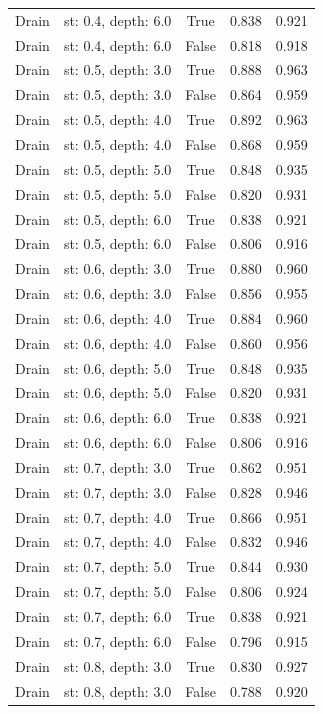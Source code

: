 \begin{small}
\begin{longtable}{llccc}
Drain & st: 0.4, depth: 6.0 & True & 0.838 & 0.921 \\
Drain & st: 0.4, depth: 6.0 & False & 0.818 & 0.918 \\
Drain & st: 0.5, depth: 3.0 & True & 0.888 & 0.963 \\
Drain & st: 0.5, depth: 3.0 & False & 0.864 & 0.959 \\
Drain & st: 0.5, depth: 4.0 & True & 0.892 & 0.963 \\
Drain & st: 0.5, depth: 4.0 & False & 0.868 & 0.959 \\
Drain & st: 0.5, depth: 5.0 & True & 0.848 & 0.935 \\
Drain & st: 0.5, depth: 5.0 & False & 0.820 & 0.931 \\
Drain & st: 0.5, depth: 6.0 & True & 0.838 & 0.921 \\
Drain & st: 0.5, depth: 6.0 & False & 0.806 & 0.916 \\
Drain & st: 0.6, depth: 3.0 & True & 0.880 & 0.960 \\
Drain & st: 0.6, depth: 3.0 & False & 0.856 & 0.955 \\
Drain & st: 0.6, depth: 4.0 & True & 0.884 & 0.960 \\
Drain & st: 0.6, depth: 4.0 & False & 0.860 & 0.956 \\
Drain & st: 0.6, depth: 5.0 & True & 0.848 & 0.935 \\
Drain & st: 0.6, depth: 5.0 & False & 0.820 & 0.931 \\
Drain & st: 0.6, depth: 6.0 & True & 0.838 & 0.921 \\
Drain & st: 0.6, depth: 6.0 & False & 0.806 & 0.916 \\
Drain & st: 0.7, depth: 3.0 & True & 0.862 & 0.951 \\
Drain & st: 0.7, depth: 3.0 & False & 0.828 & 0.946 \\
Drain & st: 0.7, depth: 4.0 & True & 0.866 & 0.951 \\
Drain & st: 0.7, depth: 4.0 & False & 0.832 & 0.946 \\
Drain & st: 0.7, depth: 5.0 & True & 0.844 & 0.930 \\
Drain & st: 0.7, depth: 5.0 & False & 0.806 & 0.924 \\
Drain & st: 0.7, depth: 6.0 & True & 0.838 & 0.921 \\
Drain & st: 0.7, depth: 6.0 & False & 0.796 & 0.915 \\
Drain & st: 0.8, depth: 3.0 & True & 0.830 & 0.927 \\
Drain & st: 0.8, depth: 3.0 & False & 0.788 & 0.920 \\

\end{longtable}
\end{small}

